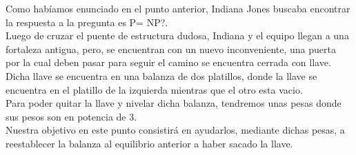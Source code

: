 Como hab\'iamos enunciado en el punto anterior, Indiana Jones buscaba encontrar la respuesta a la pregunta es P= NP?.\\

Luego de cruzar el puente de estructura dudosa, Indiana y el equipo llegan a una fortaleza antigua, pero, se encuentran con un nuevo inconveniente, una puerta por la cual deben pasar para seguir el camino se encuentra cerrada con llave.\\

Dicha llave se encuentra en una balanza de dos platillos, donde la llave se encuentra en el platillo de la izquierda mientras que el otro esta vacio.\\

Para poder quitar la llave y nivelar dicha balanza, tendremos unas pesas donde sus pesos son en potencia de 3.\\

Nuestra objetivo en este punto consistir\'a en ayudarlos, mediante dichas pesas, a reestablecer la balanza al equilibrio anterior a haber sacado la llave.\\





